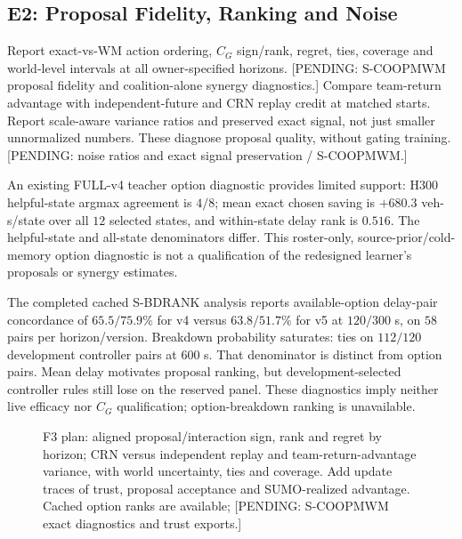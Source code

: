 \documentclass[conference]{IEEEtran}
\newcommand{\pending}[1]{\textcolor{red!80!black}{[PENDING: #1]}}
\newcommand{\blankpanel}[1]{\fbox{\rule{0pt}{#1}\rule{0.94\columnwidth}{0pt}}}
\begin{document}
\subsection{E2: Proposal Fidelity, Ranking and Noise}
Report exact-vs-WM action ordering, $C_G$ sign/rank, regret, ties, coverage
and world-level intervals at all owner-specified horizons.
\pending{S-COOPMWM proposal fidelity and coalition-alone synergy diagnostics.}
Compare team-return advantage with independent-future and CRN replay credit
at matched starts. Report scale-aware variance ratios and preserved exact
signal, not just smaller unnormalized numbers.
These diagnose proposal quality, without gating training.
\pending{noise ratios and exact signal preservation / S-COOPMWM.}

An existing FULL-v4 teacher option diagnostic provides limited support:
H300 helpful-state argmax agreement is $4/8$; mean exact chosen saving is
$+680.3$ veh-s/state over all $12$ selected states, and within-state delay
rank is $0.516$. The helpful-state and all-state denominators differ.
This roster-only, source-prior/cold-memory option diagnostic is not a
qualification of the redesigned learner's proposals or synergy estimates.

The completed cached S-BDRANK analysis reports
available-option delay-pair concordance of $65.5/75.9\%$ for v4 versus
$63.8/51.7\%$ for v5 at $120/300$ s, on $58$ pairs per horizon/version.
Breakdown probability saturates: ties on $112/120$ development controller
pairs at $600$ s. That denominator is distinct from option pairs.
Mean delay motivates proposal ranking, but development-selected controller
rules still lose on the reserved panel. These diagnostics imply neither
live efficacy nor $C_G$ qualification; option-breakdown ranking is unavailable.

\begin{figure}[t]
\centering\blankpanel{1.10in}
\caption{F3 plan: aligned proposal/interaction sign, rank and regret by horizon;
CRN versus independent replay and team-return-advantage variance, with world
uncertainty, ties and coverage. Add update traces of trust, proposal acceptance
and SUMO-realized advantage. Cached option ranks are available;
\pending{S-COOPMWM exact diagnostics and trust exports.}}
\label{fig:fidelity}
\end{figure}
\end{document}

